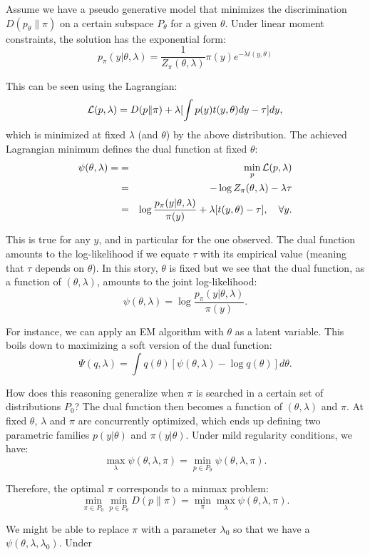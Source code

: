 \documentclass{article}
\begin{document}
Assume we have a pseudo generative model that minimizes the discrimination $D(p_\theta \| \pi)$ on a certain subspace $P_\theta$ for a given $\theta$. Under linear moment constraints, the solution has the exponential form:
$$
p_\pi (y|\theta,\lambda) = \frac{1}{Z_\pi(\theta,\lambda)} \pi(y) e^{-\lambda t(y,\theta)}
$$

This can be seen using the Lagrangian:
$$
{\cal L}(p,\lambda) = 
D(p\|\pi) + \lambda [\int p(y)t(y,\theta)dy - \tau] dy
,
$$
which is minimized at fixed $\lambda$ (and $\theta$) by the above distribution. The achieved Lagrangian minimum defines the dual function at fixed $\theta$:
\begin{eqnarray*}
\psi(\theta,\lambda) = 
& = & 
\min_p {\cal L}(p,\lambda) \\
& = & 
-\log Z_\pi(\theta,\lambda) - \lambda \tau \\
& = & 
\log\frac{p_\pi(y|\theta,\lambda)}{\pi(y)} + \lambda [t(y,\theta)-\tau],
\quad \forall y.
\end{eqnarray*}

This is true for any $y$, and in particular for the one observed. The dual function amounts to the log-likelihood if we equate $\tau$ with its empirical value (meaning that $\tau$ depends on $\theta$). In this story, $\theta$ is fixed but we see that the dual function, as a function of $(\theta,\lambda)$, amounts to the joint log-likelihood:
$$
\psi(\theta,\lambda) 
= 
\log\frac{p_\pi(y|\theta,\lambda)}{\pi(y)}
.
$$

For instance, we can apply an EM algorithm with $\theta$ as a latent variable. This boils down to maximizing a soft version of the dual function: 
$$
\Psi(q, \lambda) = \int q(\theta) \left[
\psi(\theta,\lambda)- \log q(\theta)
\right]
d\theta
.
$$

How does this reasoning generalize when $\pi$ is searched in a certain set of distributions $P_0$? The dual function then becomes a function of $(\theta,\lambda)$ and $\pi$. At fixed $\theta$, $\lambda$ and $\pi$ are concurrently optimized, which ends up defining two parametric families $p(y|\theta)$ and $\pi(y|\theta)$. Under mild regularity conditions, we have:
$$
\max_\lambda \psi(\theta,\lambda,\pi) 
= \min_{p\in P_\theta} \psi(\theta,\lambda,\pi)
.
$$

Therefore, the optimal $\pi$ corresponds to a minmax problem:
$$
\min_{\pi\in P_0}
\min_{p\in P_\theta} 
D(p\|\pi) 
= 
\min_\pi \max_\lambda \psi(\theta,\lambda,\pi)
.
$$

We might be able to replace $\pi$ with a parameter $\lambda_0$ so that we have a $\psi(\theta,\lambda,\lambda_0)$. Under  
\end{document}
